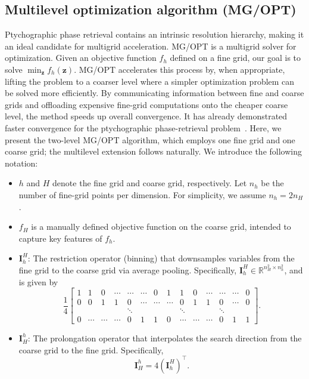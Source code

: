 \documentclass{article}
\numberwithin{equation}{section}
\begin{document}
\subsection{Multilevel optimization algorithm (MG/OPT)}\label{sec:MGOPT}
Ptychographic phase retrieval contains an intrinsic resolution hierarchy, making it an ideal candidate for multigrid acceleration. {MG/OPT is a multigrid solver for optimization. Given an objective function $f_h$ defined on a fine grid, our goal is to solve $\min_{\bm{z}} f_h(\bm{z})$. MG/OPT accelerates this process by, when appropriate, lifting the problem to a coarser level where a simpler optimization problem can be solved more efficiently. By communicating information between fine and coarse grids and offloading expensive fine-grid computations onto the cheaper coarse level, the method speeds up overall convergence. It has already demonstrated faster convergence for the ptychographic phase-retrieval problem~\cite{MGOPT_ptycho}. Here, we present the two-level MG/OPT algorithm, which employs one fine grid and one coarse grid; the multilevel extension follows naturally. We introduce the following notation:}
\begin{itemize}
  \item $h$ and $H$ denote the fine grid and coarse grid, respectively. Let $n_h$ be the number of fine-grid points per dimension. For simplicity, we assume $n_h = 2 n_H$.
  \item {$f_H$ is a manually defined objective function on the coarse grid, intended to capture key features of $f_h$.} 
    \item $\bm{I}_h^H$: The restriction operator (binning) that downsamples
    variables from the fine grid to the coarse grid via average pooling.
    Specifically, ${\bm{I}_h^H\in \mathbb{R}^{n_H^2 \times n_h^2}}$, and is given by
\begin{equation}\label{eqn:restriction_operator}
    \frac{1}{4}
    \begin{bmatrix}
    1 & 1 & 0 & \cdots & \cdots & \cdots & 0 & 1 & 1 & 0 & \cdots &  \cdots & \cdots & 0\\
    0 & 0 & 1 & 1 & 0 & \cdots & \cdots & \cdots & 0 & 1 & 1 & 0 & \cdots & 0\\
    &&&&\ddots&&&&\ddots &&&\ddots  \\
    0 & \cdots & \cdots & \cdots & 0 & 1 & 1 & 0 & \cdots & \cdots & \cdots & 0 & 1 & 1 
    \end{bmatrix}.
\end{equation}
  \item $\bm{I}_H^h$: The prolongation operator that interpolates the search direction from the coarse grid to the fine grid. Specifically, 
  \begin{equation}\label{eqn:prolongation_operator}
      \bm{I}_H^h = 4(\bm{I}_h^H)^\top.
  \end{equation}
\end{itemize}
\end{document}
